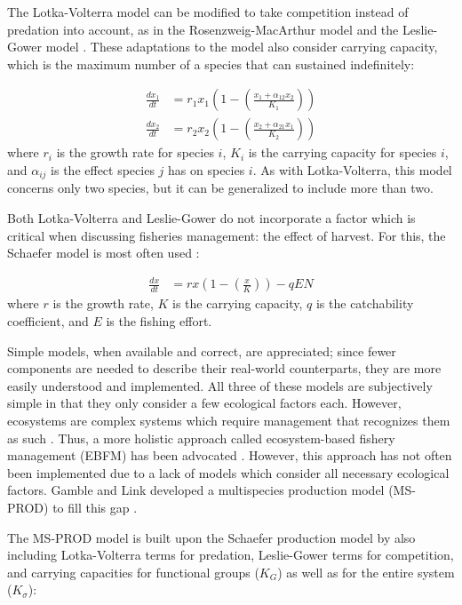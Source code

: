\documentclass{article}
\begin{document}
The Lotka-Volterra model can be modified to take competition instead of predation into account, as in the Rosenzweig-MacArthur model \cite{Rosenzweig1963Graphical} and the Leslie-Gower model \cite{leslie1960}.  These adaptations to the model also consider carrying capacity, which is the maximum number of a species that can sustained indefinitely:

\begin{align}
   \frac{d x_1}{dt} &= r_1 x_1 \left(1 - \left(\frac{x_1 + \alpha_{12} x_2}{K_1}\right)\right)
\\ \frac{d x_2}{dt} &= r_2 x_2 \left(1 - \left(\frac{x_2 + \alpha_{21} x_1}{K_2}\right)\right)
\end{align}
where $r_i$ is the growth rate for species $i$, $K_i$ is the carrying capacity for species $i$, and $\alpha_{ij}$ is the effect species $j$ has on species $i$.  As with Lotka-Volterra, this model concerns only two species, but it can be generalized to include more than two.

Both Lotka-Volterra and Leslie-Gower do not incorporate a factor which is critical when discussing fisheries management: the effect of harvest.  For this, the Schaefer model is most often used \cite{schaefer1957}:

\begin{align}
   \frac{d x}{dt} &= r x \left(1 - \left(\frac{x}{K}\right)\right) - q E N
\end{align}
where $r$ is the growth rate, $K$ is the carrying capacity, $q$ is the catchability coefficient, and $E$ is the fishing effort.

Simple models, when available and correct, are appreciated; since fewer components are needed to describe their real-world counterparts, they are more easily understood and implemented.  All three of these models are subjectively simple in that they only consider a few ecological factors each. However, ecosystems are complex systems which require management that recognizes them as such \cite{Christensen1996Report}.  Thus, a more holistic approach called ecosystem-based fishery management (EBFM) has been advocated \cite{united1999ecosystem}.  However, this approach has not often been implemented due to a lack of models which consider all necessary ecological factors.  Gamble and Link developed a multispecies production model (MS-PROD) to fill this gap \cite{Gamble20092570}.

The MS-PROD model is built upon the Schaefer production model by also including Lotka-Volterra terms for predation, Leslie-Gower terms for competition, and carrying capacities for functional groups ($K_G$) as well as for the entire system ($K_{\sigma}$):
\end{document}

